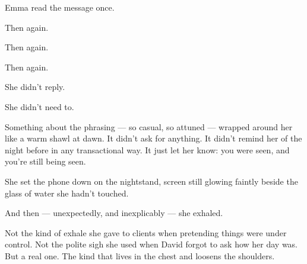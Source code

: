 \begin{center}
\end{center}

Emma read the message once.

Then again.

Then again.

Then again.

She didn’t reply.

She didn’t need to.

Something about the phrasing --- so casual, so attuned --- wrapped around her like a warm shawl at dawn.
It didn’t ask for anything.
It didn’t remind her of the night before in any transactional way.
It just let her know: you were seen, and you’re still being seen.

She set the phone down on the nightstand, screen still glowing faintly beside the glass of water she 
hadn’t touched.

And then --- unexpectedly, and inexplicably --- she exhaled.

Not the kind of exhale she gave to clients when pretending things were under control.
Not the polite sigh she used when David forgot to ask how her day was.
But a real one.
The kind that lives in the chest and loosens the shoulders.

